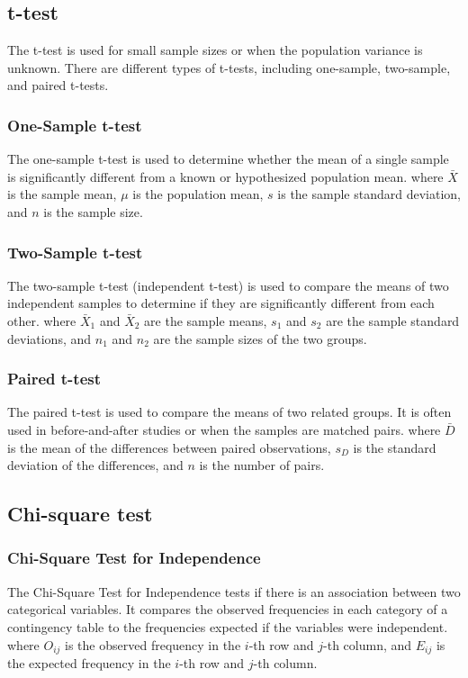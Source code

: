 \subsection{t-test}
The t-test is used for small sample sizes or when the population variance is unknown. There are different types of t-tests, including one-sample, two-sample, and paired t-tests.

\subsubsection{One-Sample t-test}
The one-sample t-test is used to determine whether the mean of a single sample is significantly different from a known or hypothesized population mean.
where $\bar{X}$ is the sample mean, $\mu$ is the population mean, $s$ is the sample standard deviation, and $n$ is the sample size.

\subsubsection{Two-Sample t-test}
The two-sample t-test (independent t-test) is used to compare the means of two independent samples to determine if they are significantly different from each other.
where $\bar{X}_1$ and $\bar{X}_2$ are the sample means, $s_1$ and $s_2$ are the sample standard deviations, and $n_1$ and $n_2$ are the sample sizes of the two groups.

\subsubsection{Paired t-test}
The paired t-test is used to compare the means of two related groups. It is often used in before-and-after studies or when the samples are matched pairs.
where $\bar{D}$ is the mean of the differences between paired observations, $s_D$ is the standard deviation of the differences, and $n$ is the number of pairs.

\subsection{Chi-square test}
\subsubsection{Chi-Square Test for Independence}
The Chi-Square Test for Independence tests if there is an association between two categorical variables. It compares the observed frequencies in each category of a contingency table to the frequencies expected if the variables were independent.
where $O_{ij}$ is the observed frequency in the $i$-th row and $j$-th column, and $E_{ij}$ is the expected frequency in the $i$-th row and $j$-th column.

